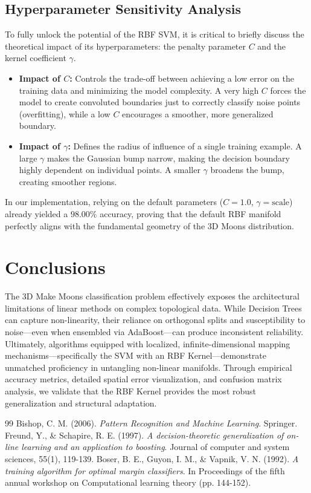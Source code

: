 \documentclass[12pt,a4paper]{article}
\begin{document}
\subsection{Hyperparameter Sensitivity Analysis}
To fully unlock the potential of the RBF SVM, it is critical to briefly discuss the theoretical impact of its hyperparameters: the penalty parameter $C$ and the kernel coefficient $\gamma$. 
\begin{itemize}
    \item \textbf{Impact of $C$:} Controls the trade-off between achieving a low error on the training data and minimizing the model complexity. A very high $C$ forces the model to create convoluted boundaries just to correctly classify noise points (overfitting), while a low $C$ encourages a smoother, more generalized boundary.
    \item \textbf{Impact of $\gamma$:} Defines the radius of influence of a single training example. A large $\gamma$ makes the Gaussian bump narrow, making the decision boundary highly dependent on individual points. A smaller $\gamma$ broadens the bump, creating smoother regions. 
\end{itemize}
In our implementation, relying on the default parameters ($C=1.0$, $\gamma=\text{scale}$) already yielded a $98.00\%$ accuracy, proving that the default RBF manifold perfectly aligns with the fundamental geometry of the 3D Moons distribution.

\section{Conclusions}
The 3D Make Moons classification problem effectively exposes the architectural limitations of linear methods on complex topological data. While Decision Trees can capture non-linearity, their reliance on orthogonal splits and susceptibility to noise—even when ensembled via AdaBoost—can produce inconsistent reliability. Ultimately, algorithms equipped with localized, infinite-dimensional mapping mechanisms—specifically the SVM with an RBF Kernel—demonstrate unmatched proficiency in untangling non-linear manifolds. Through empirical accuracy metrics, detailed spatial error visualization, and confusion matrix analysis, we validate that the RBF Kernel provides the most robust generalization and structural adaptation.

\newpage
{}  %
\begin{thebibliography}{99}
     Bishop, C. M. (2006). \textit{Pattern Recognition and Machine Learning}. Springer.
     Freund, Y., \& Schapire, R. E. (1997). \textit{A decision-theoretic generalization of on-line learning and an application to boosting}. Journal of computer and system sciences, 55(1), 119-139.
     Boser, B. E., Guyon, I. M., \& Vapnik, V. N. (1992). \textit{A training algorithm for optimal margin classifiers}. In Proceedings of the fifth annual workshop on Computational learning theory (pp. 144-152).
\end{thebibliography}
\end{document}
